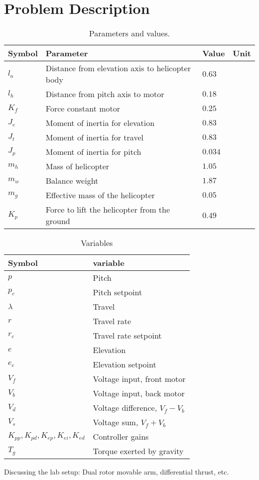 \section{Problem Description}\label{sec:prob_descr}

\begin{table}[tbp]
	\centering
	\caption{Parameters and values.}
	\begin{tabular}{llll}
		\hline
		Symbol & Parameter & Value & Unit \\
		\hline
		$l_a$ & Distance from elevation axis to helicopter body & $0.63$ & \meter \\
		$l_h$ & Distance from pitch axis to motor & $0.18$ & \meter \\
		$K_f$ & Force constant motor & $0.25$ & \newton\per\volt \\
		$J_e$ & Moment of inertia for elevation & $0.83$ & \kilogram\usk\square\meter \\
		$J_t$ & Moment of inertia for travel & $0.83$ & \kilogram\usk\square\meter \\
		$J_p$ & Moment of inertia for pitch & $0.034$ & \kilogram\usk\square\meter \\
		$m_h$ & Mass of helicopter & $1.05$ & \kilogram \\
		$m_w$ & Balance weight & $1.87$ & \kilogram \\
		$m_g$ & Effective mass of the helicopter & $0.05$ & \kilogram \\
		$K_p$ & Force to lift the helicopter from the ground & $0.49$ & \newton \\
		\hline
	\end{tabular}
	\label{tab:parameters}
\end{table}

\begin{table}[tbp]
	\centering
	\caption{Variables}
	\begin{tabular}{ll}
		\hline
		Symbol & variable \\
		\hline
		$p$ & Pitch \\
		$p_c$ & Pitch setpoint \\
		$\lambda$ & Travel \\
		$r$ & Travel rate \\
		$r_c$ & Travel rate setpoint \\
		$e$ & Elevation \\
		$e_c$ & Elevation setpoint \\
		$V_f$ & Voltage input, front motor \\
		$V_b$ & Voltage input, back motor \\
		$V_d$ & Voltage difference, $V_f - V_b$ \\
		$V_s$ & Voltage sum, $V_f + V_b$ \\
		$K_{pp}, K_{pd}, K_{ep}, K_{ei}, K_{ed}$ & Controller gains \\
		$T_g$ & Torque exerted by gravity \\
		\hline
	\end{tabular}
	\label{tab:variables}
\end{table}
Discussing the lab setup: Dual rotor movable arm, differential thrust, etc.

